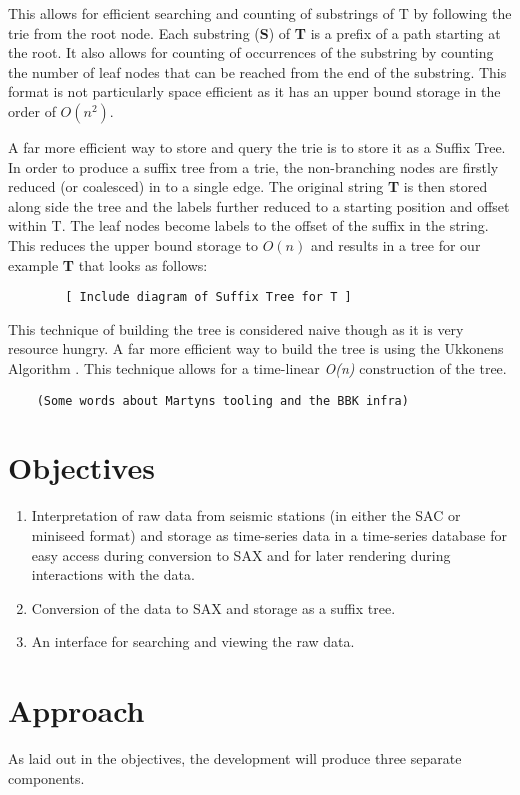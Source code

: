 \documentclass[11pt]{scrartcl}
\begin{document}
	This allows for efficient searching and counting of substrings of T by following the trie from the root node.  Each substring (\textbf{S}) of \textbf{T} is a prefix of a path starting at the root.  It also allows for counting of occurrences of the substring by counting the number of leaf nodes that can be reached from the end of the substring.  This format is not particularly space efficient as it has an upper bound storage in the order of \textit{$O(n^{2})$}.
	
	A far more efficient way to store and query the trie is to store it as a Suffix Tree.  In order to produce a suffix tree from a trie, the non-branching nodes are firstly reduced (or coalesced) in to a single edge.  The original string \textbf{T} is then stored along side the tree and the labels further reduced to a starting position and offset within T.  The leaf nodes become labels to the offset of the suffix in the string.  This reduces the upper bound storage to \textit{$O(n)$} and results in a tree for our example \textbf{T} that looks as follows:
	\begin{verbatim}
		[ Include diagram of Suffix Tree for T ]
	\end{verbatim}
	
	This technique of building the tree is considered naive though as it is very resource hungry.  A far more efficient way to build the tree is using the Ukkonens Algorithm \citep{ukkonens}.  This technique allows for a time-linear \textit{O(n)} construction of the tree.
	\begin{verbatim}
	(Some words about Martyns tooling and the BBK infra)
	\end{verbatim}

\section{Objectives}
\begin{enumerate}
	\item Interpretation of raw data from seismic stations (in either the SAC or miniseed format) and storage as time-series data in a time-series database for easy access during conversion to SAX and for later rendering during interactions with the data.
	\item Conversion of the data to SAX and storage as a suffix tree.
	\item An interface for searching and viewing the raw data.
\end{enumerate}

\section{Approach}
	As laid out in the objectives, the development will produce three separate components.
	
\end{document}
